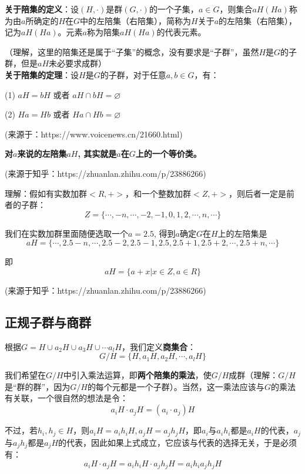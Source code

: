 \documentclass[12pt]{article}
\begin{document}
\begin{framed}
\textbf{关于陪集的定义}：设$(H,\cdot)$是群$(G,\cdot)$的一个子集，$a \in G$，则集合$aH(Ha)$称为由$a$所确定的$H$在$G$中的左陪集（右陪集），简称为$H$关于$a$的左陪集（右陪集），记为$aH(Ha)$。元素$a$称为陪集$aH(Ha)$的代表元素。

（理解，这里的陪集还是属于“子集”的概念，没有要求是“子群”，虽然$H$是$G$的子群，但是$aH$未必要求成群）
~\\

\textbf{关于陪集的定理}：设$H$是$G$的子群，对于任意$a, b \in G$，有：

(1) $aH = bH$ 或者 $aH \cap bH = \varnothing$

(2) $Ha = Hb$ 或者 $Ha \cap Hb = \varnothing$

(来源于：https://www.voicenews.cn/21660.html)

\textbf{对$a$来说的左陪集$aH$, 其实就是$a$在$G$上的一个等价类。}

(来源于知乎：https://zhuanlan.zhihu.com/p/23886266)
\end{framed}

\begin{framed}
\small{
理解：假如有实数加群$<R, +>$，和一个整数加群$<Z, +>$，则后者一定是前者的子群：
$$
Z = \{\cdots, -n, \cdots, -2, -1, 0, 1, 2, \cdots, n, \cdots \}
$$

我们在实数加群里面随便选取一个$a = 2.5$, 得到$a$确定$G$在$H$上的左陪集是
$$
aH = \{\cdots, 2.5-n, \cdots, 2.5-2, 2.5-1, 2.5, 2.5+1, 2.5+2, \cdots, 2.5+n, \cdots \}
$$

即
$$
aH = \{a+x | x \in Z, a \in R\}
$$

(来源于知乎：https://zhuanlan.zhihu.com/p/23886266)
}
\end{framed}

\subsection{正规子群与商群}

根据$G = H \cup a_2H \cup a_3H \cup \cdots a_lH$，我们定义\textbf{商集合}：
$$
G/H = \{H, a_1H, a_2H, \cdots, a_lH\}
$$

我们希望在$G/H$中引入乘法运算，即\textbf{两个陪集的乘法}，使$G/H$成群（理解：$G/H$是“群的群”，因为$G/H$的每个元都是一个子群）。当然，这一乘法应该与$G$的乘法有关联，一个很自然的想法是令：
$$
a_iH \cdot a_jH = (a_i\cdot a_j)H
$$

不过，若$h_i, h_j \in H$，则$a_iH = a_ih_iH, a_jH = a_jh_jH$，即$a_i$与$a_ih_i$都是$a_iH$的代表，$a_j$与$a_jh_j$都是$a_jH$的代表，因此如果上式成立，它应该与代表的选择无关，于是必须有：
$$
a_iH \cdot a_jH = a_ih_iH \cdot a_jh_jH = a_ih_ia_jh_jH
$$
\end{document}
